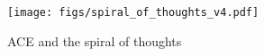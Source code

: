 \begin{figure}[!t]
\begin{center}
\centerline{
\texttt{[image: figs/spiral\_of\_thoughts\_v4.pdf]}
}
\caption{ACE and the spiral of thoughts}
\label{fig:ace}
\end{center}
\vskip -0.4in
\end{figure}





